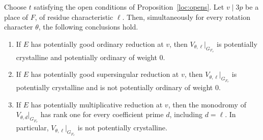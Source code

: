 \begin{corollary}\label{loc:characters}
Choose $t$ satisfying the open conditions of
Proposition~\ref{loc:opens}.  Let $v\mid3p$ be a place of $F$, of residue
characteristic $\ell$.  Then, simultaneously for every rotation
character $\theta$, the following conclusions hold.
\begin{enumerate}
\item If $E$ has potentially good ordinary reduction at $v$, then
$V_{\theta,\ell}|_{G_{F_v}}$ is potentially crystalline and potentially
ordinary of weight $0$.
\item If $E$ has potentially good supersingular reduction at $v$, then
$V_{\theta,\ell}|_{G_{F_v}}$ is potentially crystalline and is not
potentially ordinary of weight $0$.
\item If $E$ has potentially multiplicative reduction at $v$, then the
monodromy of $V_{\theta,d}|_{G_{F_v}}$ has rank one for every coefficient
prime $d$, including $d=\ell$.  In particular,
$V_{\theta,\ell}|_{G_{F_v}}$ is not potentially crystalline.
\end{enumerate}
\end{corollary}

